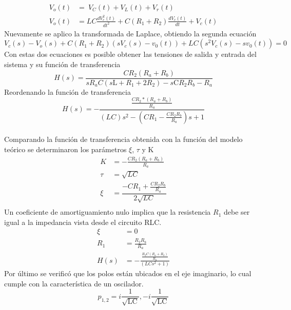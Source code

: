\documentclass[10pt,a4paper]{article} %
\begin{document}
\begin{align*}
 V_{o}(t)&=\ V_{C}(t)+ V_{L}(t)+ V_{r}(t)\\
V_{o}(t)&=LC\frac{d V_{c}^{2}(t)}{dt^{2}}+ C(R_{1}+R_{2})\frac{d V_{c}(t)}{dt}+V_{c}(t)
\end{align*}
Nuevamente se aplico la transformada de Laplace, obtiendo la segunda ecuación
\begin{equation}
V_{c}(s) - V_{o}(s) + C(R_{1} + R_{2})(sV_{c}(s) - v_{0}(t)) + 
LC(s^{2}V_{c}(s) - sv_{0}(t)) = 0
\end{equation}
Con estas dos ecuaciones es posible obtener las tensiones de salida y entrada del sistema y su función de transferencia 
\begin{equation*}
H(s)=\frac{C R_{2} (R_{a}+R_{b})}{sR_{a}C (s\text{L} +R_{1}+2 R_{2})-s\text{C}R_{2} R_{b} -R_{a}}
\end{equation*}
Reordenando la función de transferencia
\begin{equation*}
H(s)=-\frac{\frac{CR_{2}*(R_{a}+R_{b})}{R_{a}}}{(LC)s^{2}-(CR_{1}-\frac{CR_{2}R_{b}}{R_{a}})s+1}
\end{equation*}
\\
Comparando la función de transferencia obtenida con la función del modelo teórico se determinaron los parámetros $\xi$, $\tau$ y K
\begin{align*}
K&=-\frac{CR_{2}(R_{a}+R_{b})}{R_{a}}\\
\tau&=\sqrt{LC}\\
\xi&=\dfrac{-CR_{1}+\frac{CR_{2}R_{b}}{R_{a}}}{2\sqrt{LC}}\\
\end{align*}
Un coeficiente de amortiguamiento nulo implica que la resistencia $R_{1}$ debe ser igual a la impedancia vista desde el circuito RLC.
\begin{align*}
\xi&=0\\
R_{1}&=\frac{R_{2}R_{b}}{R_{a}}\\
H(s)&=-\frac{\frac{R_{2}C (R_{a}+R_{b})}{R_{a}}}{\left(LCs^2+1\right)}
\end{align*}
Por último se verificó que los polos están ubicados en el eje imaginario, lo cual cumple con la característica de un oscilador.
 \begin{equation*}
p_{1,2}=i\frac{1}{\sqrt{\text{L}\text{C}}},-i\frac{1}{\sqrt{\text{L}\text{C}}}
\end{equation*}
\end{document}
